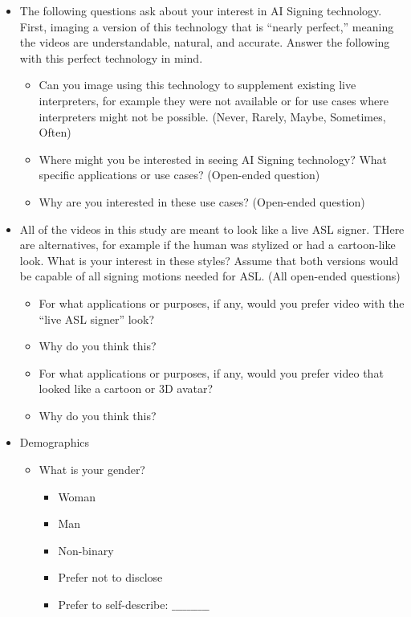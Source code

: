 \begin{itemize}
    \item The following questions ask about your interest in AI Signing technology. First, imaging a version of this technology that is ``nearly perfect,'' meaning the videos are understandable, natural, and accurate. Answer the following with this perfect technology in mind.
    \begin{itemize}
        \item Can you image using this technology to supplement existing live interpreters, for example they were not available or for use cases where interpreters might not be possible. (Never, Rarely, Maybe, Sometimes, Often)
        \item Where might you be interested in seeing AI Signing technology? What specific applications or use cases? (Open-ended question)
        \item Why are you interested in these use cases? (Open-ended question)
    \end{itemize}
    \item All of the videos in this study are meant to look like a live ASL signer. THere are alternatives, for example if the human was stylized or had a cartoon-like look. What is your interest in these styles? Assume that both versions would be capable of all signing motions needed for ASL. (All open-ended questions)
    \begin{itemize}
        \item For what applications or purposes, if any, would you prefer video with the ``live ASL signer'' look? 
        \item Why do you think this? 
        \item For what applications or purposes, if any, would you prefer video that looked like a cartoon or 3D avatar? 
        \item Why do you think this? 
    \end{itemize}
    \item Demographics
    \begin{itemize}
        \item What is your gender?
        \begin{itemize}
            \item Woman
            \item Man
            \item Non-binary
            \item Prefer not to disclose
            \item Prefer to self-describe: $\_\_\_\_\_\_\_\_\_\_$
            

\end{itemize}
\end{itemize}
\end{itemize}
